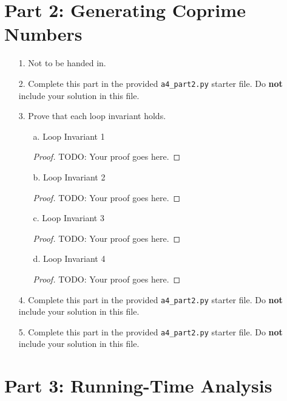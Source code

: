 \documentclass[fontsize=11pt]{article}
\begin{document}
\newpage

\section*{Part 2: Generating Coprime Numbers}

\begin{enumerate}

\item[1.]
Not to be handed in.

\item[2.]
Complete this part in the provided \texttt{a4\_part2.py} starter file.
Do \textbf{not} include your solution in this file.

\item[3.]
Prove that each loop invariant holds.

\begin{enumerate}
\item[a.] Loop Invariant 1
\begin{proof}
TODO: Your proof goes here.
\end{proof}

\item[b.] Loop Invariant 2
\begin{proof}
TODO: Your proof goes here.
\end{proof}

\item[c.] Loop Invariant 3
\begin{proof}
TODO: Your proof goes here.
\end{proof}

\item[d.] Loop Invariant 4
\begin{proof}
TODO: Your proof goes here.
\end{proof}
\end{enumerate}

\item[4.]
Complete this part in the provided \texttt{a4\_part2.py} starter file.
Do \textbf{not} include your solution in this file.

\item[5.]
Complete this part in the provided \texttt{a4\_part2.py} starter file.
Do \textbf{not} include your solution in this file.
\end{enumerate}

\newpage

\section*{Part 3: Running-Time Analysis}
\end{document}
